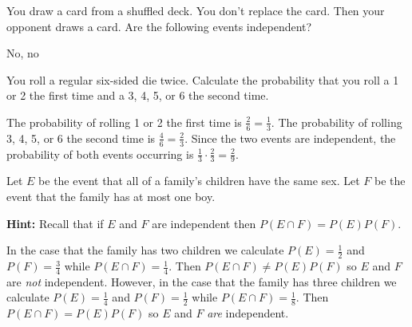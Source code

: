 \documentclass[answers,12pt]{exam}
\begin{document}
\begin{questions}
\question You draw a card from a shuffled deck. You don't replace
the card. Then your opponent draws a card. Are the following events
independent?
\begin{solution} No, no\end{solution}

\question You roll a regular six-sided die twice. Calculate
the probability that you roll a 1 or 2 the first time and a
3, 4, 5, or 6 the second time.
\begin{solution} The probability of rolling 1 or 2 the first
time is $\frac{2}{6}=\frac{1}{3}$.
The probability of rolling 3, 4, 5, or 6 the second time
is $\frac{4}{6}=\frac{2}{3}$.
Since the two events are independent, the probability of both
events occurring is $\frac{1}{3}\cdot\frac{2}{3}=\frac{2}{9}$. \end{solution}

\question Let $E$ be the event that all of a family's children
have the same sex. Let $F$ be the event that the family has
at most one boy.
{\bf Hint:} Recall that if $E$ and $F$ are independent then
$P\left(E\cap F\right)=P\left(E\right)P\left(F\right)$.
\begin{solution}
In the case that the family has two children we calculate
$P\left(E\right)=\frac{1}{2}$ and $P\left(F\right)=\frac{3}{4}$
while $P\left(E\cap F\right)=\frac{1}{4}$. Then
$P\left(E\cap F\right)\ne P\left(E\right)P\left(F\right)$
so $E$ and $F$ are {\em not} independent.
However, in the case that the family has three children we calculate
$P\left(E\right)=\frac{1}{4}$ and $P\left(F\right)=\frac{1}{2}$
while $P\left(E\cap F\right)=\frac{1}{8}$. Then
$P\left(E\cap F\right)=P\left(E\right)P\left(F\right)$
so $E$ and $F$ {\em are} independent.
\end{solution}


\end{questions}
\end{document}

